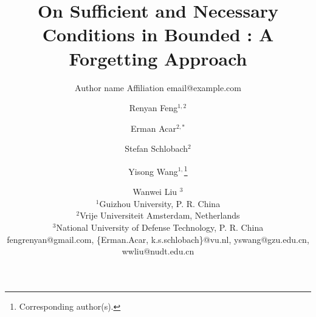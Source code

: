 \documentclass{article}
\title{On Sufficient and Necessary Conditions in Bounded \CTL: A Forgetting Approach}
\author{%
    Author name
    \affiliations
    Affiliation
    \emails
    email@example.com    %
}
\author{%
Renyan Feng$^{1,2}$\and
Erman Acar$^{2,*}$\and
Stefan Schlobach$^{2}$\and
Yisong Wang$^{1,}$\footnote{Corresponding author(s).} \and
Wanwei Liu $^3$\\
\affiliations
$^{1}$Guizhou University, P. R. China\\
$^{2}$Vrije Universiteit Amsterdam, Netherlands\\
$^{3}$National University of Defense Technology, P. R. China\\
\emails
fengrenyan@gmail.com,
\{Erman.Acar, k.s.schlobach\}@vu.nl,
yswang@gzu.edu.cn,
wwliu@nudt.edu.cn
}
\begin{document}
\newcommand{\tuple}[1]{{\langle{#1}\rangle}}
\newcommand{\Mod}{\textit{Mod}}
\newcommand\ie{{\it i.e. }}
\newcommand\eg{{\it e.g.}}
\renewcommand{\st}{s.t.}
\newtheorem{definition}{Definition}
\newtheorem{lemma}{Lemma}
\newtheorem{proposition}{Proposition}
\newtheorem{corollary}[theorem]{Corollary}
\newcommand{\rto}{\rightarrow}
\newcommand{\lto}{\leftarrow}
\newcommand{\lrto}{\leftrightarrow}
\newcommand{\Rto}{\Rightarrow}
\newcommand{\Lto}{\Leftarrow}
\newcommand{\LRto}{\Leftrightarrow}
\newcommand{\Var}{\textit{Var}}
\newcommand{\Forget}{\textit{Forget}}
\newcommand{\KForget}{\textit{KForget}}
\newcommand{\TForget}{\textit{TForget}}
\newcommand{\Fst}{\textit{Fst}}
\newcommand{\dep}{\textit{dep}}
\newcommand{\term}{\textit{term}}
\newcommand{\literal}{\textit{literal}}

\newcommand{\Atom}{\mathcal{A}}
\newcommand{\SFive}{\textbf{S5}}
\newcommand{\MPK}{\textsc{k}}
\newcommand{\MPB}{\textsc{b}}
\newcommand{\MPT}{\textsc{t}}
\newcommand{\MPA}{\forall}
\newcommand{\MPE}{\exists}

\newcommand{\DNF}{\textit{DNF}}
\newcommand{\CNF}{\textit{CNF}}

\newcommand{\degree}{\textit{degree}}
\newcommand{\sunfold}{\textit{sunfold}}

\newcommand{\Pos}{\textit{Pos}}
\newcommand{\Neg}{\textit{Neg}}
\newcommand\wrt{{\it w.r.t.}}
\newcommand{\Hm} {{\cal M}}
\newcommand{\Hw} {{\cal W}}
\newcommand{\Hr} {{\cal R}}
\newcommand{\Hb} {{\cal B}}
\newcommand{\Ha} {{\cal A}}

\newcommand{\Dsj}{\triangledown}

\newcommand{\wnext}{\widetilde{\bigcirc}}
\newcommand{\nex}{\bigcirc}
\newcommand{\ness}{\square}
\newcommand{\qness}{\boxminus}
\newcommand{\wqnext}{\widetilde{\circleddash}}
\newcommand{\qnext}{\circleddash}
\newcommand{\may}{\lozenge}
\newcommand{\qmay}{\blacklozenge}
\newcommand{\unt} {{\cal U}}
\newcommand{\since} {{\cal S}}
\newcommand{\SNF} {\textit{SNF$_C$}}
\newcommand{\start}{\textbf{start}}
\newcommand{\Elm}{\textit{Elm}}
\newcommand{\simp}{\textbf{simp}}
\newcommand{\nnf}{\textbf{nnf}}
\end{document}
